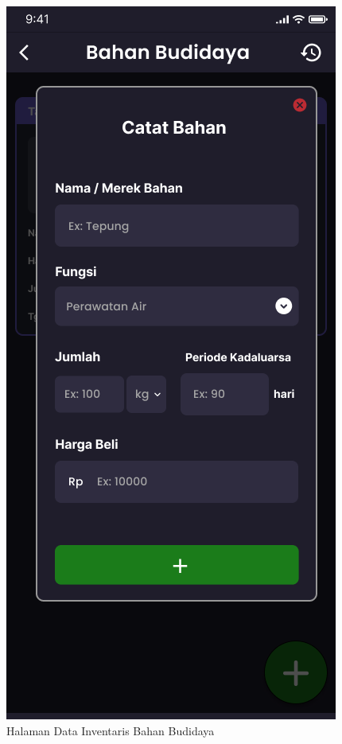 \begin{spacing}{1.5}
\begin{figure}[H]
			\caption{Halaman Data Inventaris Bahan Budidaya}
		\endminipage\hfill
			\includegraphics[width=\linewidth]{gambar/sprint1/mockup_input_materials.png}

\end{figure}
\end{spacing}
